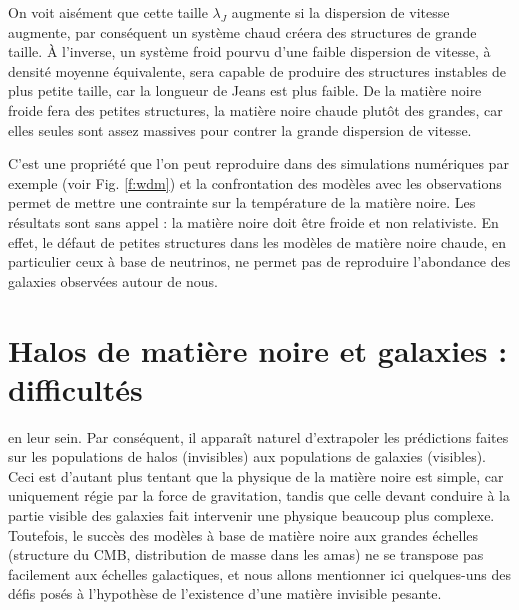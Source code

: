 On voit aisément que cette taille $\lambda_J$ augmente si la dispersion de vitesse augmente, par conséquent un système chaud créera des structures de grande taille. À l'inverse, un système froid pourvu d'une faible dispersion de vitesse, à densité moyenne équivalente, sera capable de produire des structures instables de plus petite taille, car la longueur de Jeans est plus faible. De la matière noire froide fera des petites structures, la matière noire chaude  plutôt des grandes, car elles seules sont assez massives pour contrer la grande dispersion de vitesse. 

C'est une propriété que l'on peut reproduire dans des simulations numériques par exemple (voir Fig. \ref{f:wdm}) et la confrontation des modèles avec les observations permet de mettre une contrainte sur la température de la matière noire. Les résultats sont sans appel : la matière noire doit être froide et non relativiste. En effet, le défaut de petites structures dans les modèles de matière noire chaude, en particulier ceux à base de neutrinos, ne permet pas de reproduire l'abondance des galaxies observées autour de nous.

\section{Halos de matière noire et galaxies : difficultés}
 en leur sein. Par conséquent, il apparaît naturel d'extrapoler les prédictions faites sur les populations de halos (invisibles) aux populations de galaxies (visibles). Ceci est d'autant plus tentant que la physique de la matière noire est simple, car uniquement régie par la force de gravitation, tandis que celle devant conduire à la partie visible des galaxies fait intervenir une physique beaucoup plus complexe. Toutefois, le succès des modèles à base de matière noire aux grandes échelles (structure du CMB, distribution de masse dans les amas) ne se transpose pas facilement aux échelles galactiques, et nous allons mentionner ici quelques-uns des défis posés à l'hypothèse de l'existence d'une matière invisible pesante.

